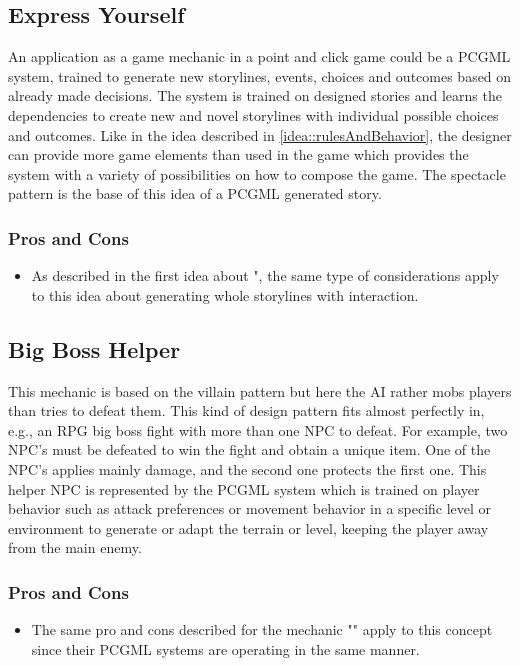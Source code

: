 \documentclass[MGS,Master,english]{twbook}%
\begin{document}
\subsection{Express Yourself} \label{idea::expressYourself}
An application as a game mechanic in a point and click game could be a \ac{PCGML} system, trained to generate new storylines, events, choices and outcomes based on already made decisions. The system is trained on designed stories and learns the dependencies to create new and novel storylines with individual possible choices and outcomes. Like in the idea described in \ref{idea::rulesAndBehavior}, the designer can provide more game elements than used in the game which provides the system with a variety of possibilities on how to compose the game. The spectacle pattern is the base of this idea of a \ac{PCGML} generated story.

\subsubsection{Pros and Cons}
\begin{itemize}
	\item As described in the first idea about ", the same type of considerations apply to this idea about generating whole storylines with interaction.
\end{itemize}

\subsection{Big Boss Helper} \label{idea::bigBossHelper}
This mechanic is based on the villain pattern but here the \ac{AI} rather mobs players than tries to defeat them. This kind of design pattern fits almost perfectly in, e.g., an \ac{RPG} big boss fight with more than one \ac{NPC} to defeat. For example, two \ac{NPC}’s must be defeated to win the fight and obtain a unique item. One of the \ac{NPC}'s applies mainly damage, and the second one protects the first one. This helper \ac{NPC} is represented by the \ac{PCGML} system which is trained on player behavior such as attack preferences or movement behavior in a specific level or environment to generate or adapt the terrain or level, keeping the player away from the main enemy.

\subsubsection{Pros and Cons}
\begin{itemize}
	\item The same pro and cons described for the mechanic "" apply to this concept since their \ac{PCGML} systems are operating in the same manner.
\end{itemize}
\end{document}
